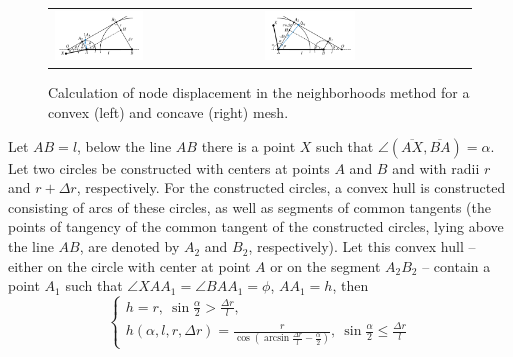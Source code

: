 \documentclass[
11pt,%
tightenlines,%
twoside,%
onecolumn,%
nofloats,%
nobibnotes,%
nofootinbib,%
superscriptaddress,%
noshowpacs,%
centertags]%
{revtex4}
\begin{document}
\begin{figure}[ht]
\setcaptionmargin{5mm}
\onelinecaptionsfalse %
\begin{tabular}{ll}
\includegraphics[width=0.45\textwidth]{pics/accuracy_okrestnost.pdf}
&
\includegraphics[width=0.45\textwidth]{pics/accuracy_okrestnost2.pdf}
\end{tabular}
\caption{Calculation of node displacement in the neighborhoods method for a convex (left) and concave (right) mesh.}
\label{fig:text_1_remesh_2d_accuracy_okrestnost}
\end{figure}

\begin{lemma}\label{lem:text_1_remesh_2d_accuracy_okrestnost}
Let $AB = l$, below the line $AB$ there is a point $X$ such that $\angle (\overline{AX}, \overline{BA}) = \alpha$.
Let two circles be constructed with centers at points $A$ and $B$ and with radii $r$ and $r + \Delta r$, respectively.
For the constructed circles, a convex hull is constructed consisting of arcs of these circles, as well as segments of common tangents (the points of tangency of the common tangent of the constructed circles, lying above the line $AB$, are denoted by $A_2$ and $B_2$, respectively).
Let this convex hull -- either on the circle with center at point $A$ or on the segment $A_2B_2$ -- contain a point $A_1$ such that $\angle XAA_1 = \angle BAA_1 = \phi$, $AA_1 = h$, then
\begin{equation}
	\begin{cases}\label{eqn:text_1_remesh_2d_okr_h}
		h = r, \  \sin \frac{\alpha}{2} > \frac{\Delta r}{l}, \\
		h(\alpha, l, r, \Delta r) = \frac{r}{\cos \left( \arcsin \frac{\Delta r}{l} - \frac{\alpha}{2} \right)}, \  \sin \frac{\alpha}{2} \le \frac{\Delta r}{l}
	\end{cases}
\end{equation}
\end{lemma}
\end{document}
